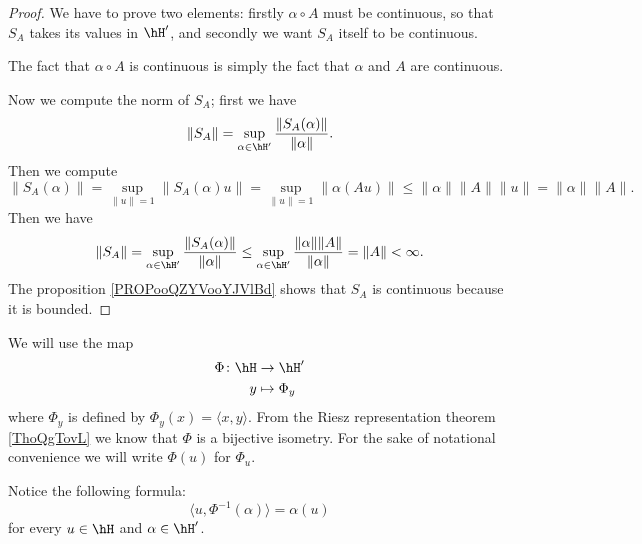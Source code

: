 \begin{proof}
	We have to prove two elements: firstly \( \alpha\circ A\) must be continuous, so that \( S_A\) takes its values in \( \hH'\), and secondly we want \( S_A\) itself to be continuous.

	The fact that \( \alpha\circ A\) is continuous is simply the fact that \( \alpha\) and \( A\) are continuous.

	Now we compute the norm of \( S_A\); first we have
	\begin{equation}
		\| S_A \|=\sup_{\alpha\in \hH'}\frac{ \| S_A(\alpha) \| }{ \| \alpha \| }.
	\end{equation}
	Then we compute
	\begin{equation}
		\| S_A(\alpha) \|=\sup_{\| u \|=1}\| S_A(\alpha)u \|=\sup_{\| u \|=1}\| \alpha(Au) \|\leq \| \alpha \|\| A \|\| u \|=\| \alpha \|\| A \|.
	\end{equation}
	Then we have
	\begin{equation}
		\| S_A \|=\sup_{\alpha\in \hH'}\frac{ \| S_A(\alpha) \| }{ \| \alpha \| }\leq \sup_{\alpha\in \hH'}\frac{ \| \alpha \|\| A \| }{ \| \alpha \| }=\| A \|<\infty.
	\end{equation}
	The proposition \ref{PROPooQZYVooYJVlBd} shows that \( S_A \) is continuous because it is bounded.
\end{proof}

We will use the map
\begin{equation}
	\begin{aligned}
		\Phi\colon \hH & \to \hH'       \\
		y              & \mapsto \Phi_y
	\end{aligned}
\end{equation}
where \( \Phi_y\) is defined by \( \Phi_y(x)=\langle x, y\rangle \). From the Riesz representation theorem \ref{ThoQgTovL} we know that \( \Phi\) is a bijective isometry. For the sake of notational convenience we will write \( \Phi(u)\) for \( \Phi_u\).

Notice the following formula:
\begin{equation}        \label{EQooHWQPooNeYokT}
	\langle u, \Phi^{-1}(\alpha)\rangle =\alpha(u)
\end{equation}
for every \( u\in \hH\) and \( \alpha\in\hH'\).

